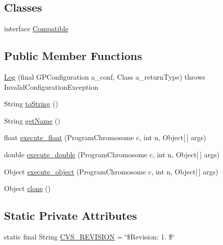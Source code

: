 \subsection*{Classes}
\begin{DoxyCompactItemize}
\item 
interface \hyperlink{interfaceorg_1_1jgap_1_1gp_1_1function_1_1_log_1_1_compatible}{Compatible}
\end{DoxyCompactItemize}
\subsection*{Public Member Functions}
\begin{DoxyCompactItemize}
\item 
\hyperlink{classorg_1_1jgap_1_1gp_1_1function_1_1_log_ae46419012d390ab9d53379da85f5c35e}{Log} (final G\-P\-Configuration a\-\_\-conf, Class a\-\_\-return\-Type)  throws Invalid\-Configuration\-Exception 
\item 
String \hyperlink{classorg_1_1jgap_1_1gp_1_1function_1_1_log_a4be32d3d6841ec1e6ce459f655ac3a43}{to\-String} ()
\item 
String \hyperlink{classorg_1_1jgap_1_1gp_1_1function_1_1_log_aa4df3b7783968cd0231d2959c4dfa61e}{get\-Name} ()
\item 
float \hyperlink{classorg_1_1jgap_1_1gp_1_1function_1_1_log_aeac90594b45aaeb41590ad8520bf21a0}{execute\-\_\-float} (Program\-Chromosome c, int n, Object\mbox{[}$\,$\mbox{]} args)
\item 
double \hyperlink{classorg_1_1jgap_1_1gp_1_1function_1_1_log_a2fb1615b28baa0b2c3a09927140c936b}{execute\-\_\-double} (Program\-Chromosome c, int n, Object\mbox{[}$\,$\mbox{]} args)
\item 
Object \hyperlink{classorg_1_1jgap_1_1gp_1_1function_1_1_log_a5ce0330f45361425f5afd104e18acb6f}{execute\-\_\-object} (Program\-Chromosome c, int n, Object\mbox{[}$\,$\mbox{]} args)
\item 
Object \hyperlink{classorg_1_1jgap_1_1gp_1_1function_1_1_log_a6cd58dffe9e1a74bcf02c7a277ae0e37}{clone} ()
\end{DoxyCompactItemize}
\subsection*{Static Private Attributes}
\begin{DoxyCompactItemize}
\item 
static final String \hyperlink{classorg_1_1jgap_1_1gp_1_1function_1_1_log_abce969bb67ad5b79ebb16243194f4c7e}{C\-V\-S\-\_\-\-R\-E\-V\-I\-S\-I\-O\-N} = \char`\"{}\$Revision\-: 1. \$\char`\"{}
\end{DoxyCompactItemize}

